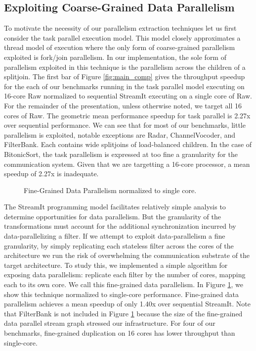 \subsection{Exploiting Coarse-Grained Data Parallelism}
To motivate the necessity of our parallelism extraction techniques let
us first consider the task parallel execution model.  This model
closely approximates a thread model of execution where the only form
of coarse-grained parallelism exploited is fork/join parallelism.  In
our implementation, the sole form of parallelism exploited in this
technique is the parallelism across the children of a splitjoin. The
first bar of Figure \ref{fig:main_comp} gives the throughput speedup
for the each of our benchmarks running in the task parallel model
executing on 16-core Raw normalized to sequential StreamIt executing
on a single core of Raw.  For the remainder of the presentation,
unless otherwise noted, we target all 16 cores of Raw.  The geometric
mean performance speedup for task parallel is 2.27x over sequential
performance. We can see that for most of our benchmarks, little
parallelism is exploited, notable exceptions are Radar,
ChannelVocoder, and FilterBank.  Each contains wide splitjoins of
load-balanced children.  In the case of BitonicSort, the task
parallelism is expressed at too fine a granularity for the
communication system.  Given that we are targetting a 16-core
processor, a mean speedup of 2.27x is inadequate.

\begin{figure}[t]
\centering
{}
\caption{Fine-Grained Data Parallelism normalized to single core.
\protect\label{fig:fine_data}}
\vspace{-6pt}
\end{figure}
The StreamIt programming model facilitates relatively simple analysis
to determine opportunities for data parallelism.  But the granularity
of the transformations must account for the additional synchronization
incurred by data-parallelizing a filter.  If we attempt to exploit
data-parallelism a fine granularity, by simply replicating each
stateless filter across the cores of the architecture we run the risk
of overwhelming the communication substrate of the target
architecture.  To study this, we implemented a simple algorithm for
exposing data parallelism: replicate each filter by the number of
cores, mapping each to its own core.  We call this fine-grained data
parallelism.  In Figure \ref{fig:fine_data}, we show this technique
normalized to single-core performance.  Fine-grained data parallelism
achieves a mean speedup of only 1.40x over sequential StreamIt.  Note
that FilterBank is not included in Figure \ref{fig:fine_data} because
the size of the fine-grained data parallel stream graph stressed our
infrastructure.  For four of our benchmarks, fine-grained duplication
on 16 cores has lower throughput than single-core.

